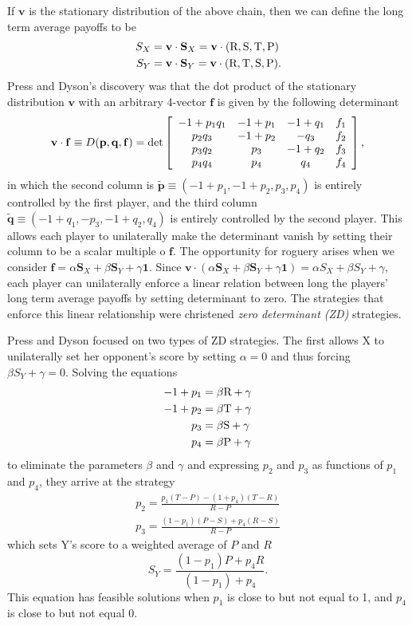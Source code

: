 If $\mathbf{v}$ is the stationary distribution of the above chain, then we can define the long term average payoffs to be
\begin{align*}
S_X &= \mathbf{v} \cdot \mathbf{S}_X = \mathbf{v} \cdot (\textrm{R}, \textrm{S}, \textrm{T}, \textrm{P}) \\
S_Y &= \mathbf{v} \cdot \mathbf{S}_Y = \mathbf{v} \cdot (\textrm{R}, \textrm{T}, \textrm{S}, \textrm{P}).
\end{align*}
Press and Dyson's discovery was that the dot product of the stationary distribution $\mathbf{v}$ with an arbitrary 4-vector $\mathbf{f}$ is given by the following determinant
\[
\mathbf{v}\cdot \mathbf{f} \equiv D(\mathbf{p}, \mathbf{q}, \mathbf{f})
= \det
\left[
\begin{array}{c c c c}
-1 + p_1 q_1    &	-1 + p_1	&	-1 + q_1	&	f_1 \\
p_2 q_3         &	-1 + p_2	&	-q_3		&	f_2 \\
p_3 q_2 		&	p_3			&	-1 + q_2	&	f_3 \\
p_4 q_4			&	p_4			&	q_4			&	f_4
\end{array}
\right],
\]
in which the second column is $\tilde{\mathbf{p}} \equiv (-1 + p_1, -1 + p_2, p_3, p_4)$ is entirely controlled by the first player, and the third column $\tilde{\mathbf{q}} \equiv (-1 + q_1, -p_3, -1 + q_2, q_4)$ is entirely controlled by the second player. This allows each player to unilaterally make the determinant vanish by setting their column to be a scalar multiple o $\mathbf{f}$. The opportunity for roguery arises when we consider $\mathbf{f} = \alpha \mathbf{S}_X + \beta \mathbf{S}_Y + \gamma\mathbf{1}$. Since $\mathbf{v} \cdot  (\alpha \mathbf{S}_X + \beta \mathbf{S}_Y + \gamma\mathbf{1}) = \alpha S_X + \beta S_Y + \gamma$, each player can unilaterally enforce a linear relation between long the players' long term average payoffs by setting determinant to zero. The strategies that enforce this linear relationship were christened \textit{zero determinant (ZD)} strategies.

Press and Dyson focused on two types of ZD strategies. The first allows X  to unilaterally set her opponent's score by setting $\alpha = 0$ and thus forcing $\beta S_Y + \gamma = 0$. Solving the equations
\begin{align*}
-1 + p_1 &= \beta \textrm{R} + \gamma \\
-1 + p_2 &= \beta \textrm{T} + \gamma \\
p_3 &= \beta \textrm{S} + \gamma \\
p_4 &= \beta \textrm{P} + \gamma
\end{align*}
to eliminate the parameters $\beta$ and $\gamma$ and expressing $p_2$ and $p_3$ as functions of $p_1$ and $p_4$, they arrive at the strategy
\begin{align*}
p_2 = \frac{p_1(T - P) - (1+p_4)(T-R)}{R-P} \\
p_3 = \frac{(1-p_1)(P-S)+p_4(R-S)}{R-P}
\end{align*}
which sets Y's score to a weighted average of $P$ and $R$
\[
S_Y = \frac{(1-p_1)P + p_4 R}{(1-p_1) + p_4}.
\]
This equation has feasible solutions when $p_1$ is close to but not equal to 1, and $p_4$ is close to but not equal 0.


